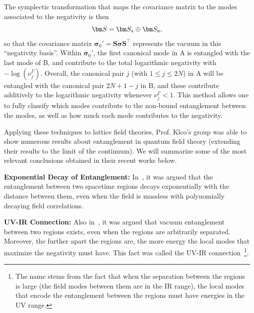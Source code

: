 \documentclass[letterpaper,12pt,titlepage,oneside,final]{book}
\newcommand{\tc}[1]{\textsc{#1}}
\begin{document}
The symplectic transformation that maps the covariance matrix to the modes associated to the negativity is then
\begin{equation}
    \bm S = \bm S_\tc{a}\oplus \bm S_\tc{b},
\end{equation}
so that the covariance matrix $\bm \sigma_0' = \bm S \bm \sigma \bm S^\intercal$ represents the vacuum in this ``negativity basis''. Within $\bm \sigma_0'$, the first canonical mode in A is entangled with the last mode of B, and contribute to the total logarithmic negativity with $- \log(\nu_j^\Gamma)$. Overall, the canonical pair $j$ (with $1\leq j\leq 2N$) in A will be entangled with the canonical pair $2N+1-j$ in B, and these contribute additively to the logarithmic negativity whenever $\nu_j^\Gamma<1$. This method allows one to fully classify which modes contribute to the non-bound entanglement between the modes, as well as how much each mode contributes to the negativity. 

Applying these techniques to lattice field theories, Prof. Klco's group was able to show numerous results about entanglement in quantum field theory (extending their results to the limit of the continuum). We will summarize some of the most relevant conclusions obtained in their recent works below.

\noindent\textbf{Exponential Decay of Entanglement:} In~\cite{KlcoUVIR,KlcoEntAllDist}, it was argued that the entanglement between two spacetime regions decays exponentially with the distance between them, even when the field is massless with polynomially decaying field correlations.

\noindent\textbf{UV-IR Connection:} Also in~\cite{KlcoEntAllDist}, it was argued that vacuum entanglement between two regions exists, even when the regions are arbitrarily separated. Moreover, the further apart the regions are, the more energy the local modes that maximize the negativity must have. This fact was called the UV-IR connection~\cite{KlcoUVIR}\footnote{The name stems from the fact that when the separation between the regions is large (the field modes between them are in the IR range), the local modes that encode the entanglement between the regions must have energies in the UV range.}. 
\end{document}
